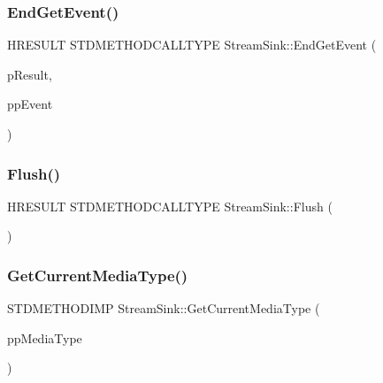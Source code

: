 \mbox{\label{class_stream_sink_af6389de29e4ae3b917a8c08d478d5c31}} 
\subsubsection{\texorpdfstring{End\+Get\+Event()}{EndGetEvent()}}
{\footnotesize\ttfamily H\+R\+E\+S\+U\+LT S\+T\+D\+M\+E\+T\+H\+O\+D\+C\+A\+L\+L\+T\+Y\+PE Stream\+Sink\+::\+End\+Get\+Event (\begin{DoxyParamCaption}\item[{I\+M\+F\+Async\+Result $\ast$}]{p\+Result,  }\item[{I\+M\+F\+Media\+Event $\ast$$\ast$}]{pp\+Event }\end{DoxyParamCaption})\hspace{0.3cm}{\ttfamily [inline]}}

\mbox{\label{class_stream_sink_a92fca921c52cb7252f4c38c30e26c81a}} 
\subsubsection{\texorpdfstring{Flush()}{Flush()}}
{\footnotesize\ttfamily H\+R\+E\+S\+U\+LT S\+T\+D\+M\+E\+T\+H\+O\+D\+C\+A\+L\+L\+T\+Y\+PE Stream\+Sink\+::\+Flush (\begin{DoxyParamCaption}\item[{void}]{ }\end{DoxyParamCaption})\hspace{0.3cm}{\ttfamily [inline]}}

\mbox{\label{class_stream_sink_a57c71b0ab64438514d32436237d38758}} 
\subsubsection{\texorpdfstring{Get\+Current\+Media\+Type()}{GetCurrentMediaType()}}
{\footnotesize\ttfamily S\+T\+D\+M\+E\+T\+H\+O\+D\+I\+MP Stream\+Sink\+::\+Get\+Current\+Media\+Type (\begin{DoxyParamCaption}\item[{I\+M\+F\+Media\+Type $\ast$$\ast$}]{pp\+Media\+Type }\end{DoxyParamCaption})\hspace{0.3cm}{\ttfamily [inline]}}

